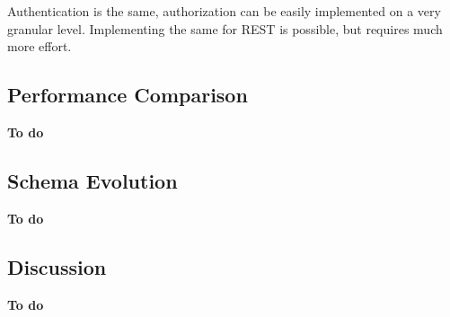 Authentication is the same, authorization can be easily implemented on a very granular level.
Implementing the same for REST is possible, but requires much more effort.

\subsection{Performance Comparison}

\textbf{To do}

\subsection{Schema Evolution}

\textbf{To do}

\subsection{Discussion}

\textbf{To do}